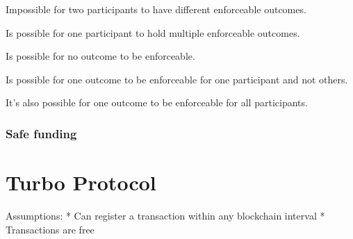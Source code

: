 Impossible for two participants to have different enforceable outcomes.

Is possible for one participant to hold multiple enforceable outcomes.

Is possible for no outcome to be enforceable.

Is possible for one outcome to be enforceable for one participant and not others.

It's also possible for one outcome to be enforceable for all participants.

\subsubsection{Safe funding}

\section{Turbo Protocol}




Assumptions:
* Can register a transaction within any blockchain interval
* Transactions are free


